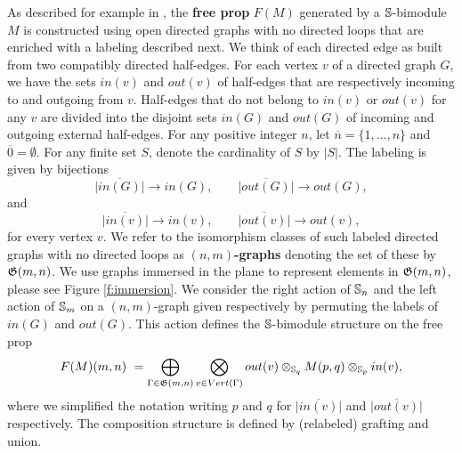 As described for example in \cite{Markl08, Fresse2010props}, the \textbf{free prop} $F(M)$ generated by a \mbox{$\S$-bimodule} $M$ is constructed using open directed graphs with no directed loops that are enriched with a labeling described next. We think of each directed edge as built from two compatibly directed half-edges. For each vertex $v$ of a directed graph $G$, we have the sets $in(v)$ and $out(v)$ of half-edges that are respectively incoming to and outgoing from $v$. Half-edges that do not belong to $in(v)$ or $out(v)$ for any $v$ are divided into the disjoint sets $in(G)$ and $out(G)$ of incoming and outgoing external half-edges. For any positive integer $n$, let $\overline{n} = \{1,\dots,n\}$ and $\overline{0} = \emptyset$. For any finite set $S$, denote the cardinality of $S$ by $|S|$. The labeling is given by bijections  
\begin{equation*}
\overline{|in(G)|}\to in(G), \qquad
\overline{|out(G)|}\to out(G),
\end{equation*}
and
\begin{equation*}
\overline{|in(v)|}\to in(v), \qquad
\overline{|out(v)|}\to out(v),
\end{equation*}
for every vertex $v$.
We refer to the isomorphism classes of such labeled directed graphs with no directed loops as $(n,m)$\textbf{-graphs} denoting the set of these by $\G(m,n)$.
We use graphs immersed in the plane to represent elements in $\G(m,n)$, please see Figure \ref{f:immersion}.
We consider the right action of $\S_n$ and the left action of $\S_m$ on a $(n,m)$-graph given respectively by permuting the labels of $in(G)$ and $out(G)$. This action defines the $\S$-bimodule structure on the free prop
\begin{equation} \label{e:free prop}
F(M)(m,n) \ = \bigoplus_{\Gamma \in \G(m,n)} \bigotimes_{v \in Vert(\Gamma)} out(v) \otimes_{\S_q} M(p, q) \otimes_{\S_p} in(v),
\end{equation}
where we simplified the notation writing $p$ and $q$ for $\overline{|in(v)|}$ and $\overline{|out(v)|}$ respectively. The composition structure is defined by (relabeled) grafting and union.



